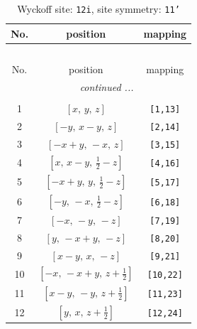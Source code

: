 \documentclass[fleqn,8pt]{jsarticle}
\begin{document}
\renewcommand{\arraystretch}{1.2}
\begin{longtable}{ccc}
\caption{Wyckoff site: {\tt 12i}, site symmetry: {\tt 11'}}
 \\
 \hline \hline
No. & position & mapping \\ \hline \endfirsthead

\multicolumn{2}{l}{\tablename\ \thetable{}} \\
 \hline \hline
No. & position & mapping \\ \hline \endhead

 \hline \hline
\multicolumn{2}{r}{\footnotesize\it continued ...} \\ \endfoot

 \hline \hline
\multicolumn{2}{r}{} \\ \endlastfoot

1 & $\left[ x,\, y,\, z \right]$ & {\tt [1,13]} \\ \hline
2 & $\left[ - y,\, x - y,\, z \right]$ & {\tt [2,14]} \\ \hline
3 & $\left[ - x + y,\, - x,\, z \right]$ & {\tt [3,15]} \\ \hline
4 & $\left[ x,\, x - y,\, \frac{1}{2} - z \right]$ & {\tt [4,16]} \\ \hline
5 & $\left[ - x + y,\, y,\, \frac{1}{2} - z \right]$ & {\tt [5,17]} \\ \hline
6 & $\left[ - y,\, - x,\, \frac{1}{2} - z \right]$ & {\tt [6,18]} \\ \hline
7 & $\left[ - x,\, - y,\, - z \right]$ & {\tt [7,19]} \\ \hline
8 & $\left[ y,\, - x + y,\, - z \right]$ & {\tt [8,20]} \\ \hline
9 & $\left[ x - y,\, x,\, - z \right]$ & {\tt [9,21]} \\ \hline
10 & $\left[ - x,\, - x + y,\, z + \frac{1}{2} \right]$ & {\tt [10,22]} \\ \hline
11 & $\left[ x - y,\, - y,\, z + \frac{1}{2} \right]$ & {\tt [11,23]} \\ \hline
12 & $\left[ y,\, x,\, z + \frac{1}{2} \right]$ & {\tt [12,24]} \\
\end{longtable}
\end{document}
